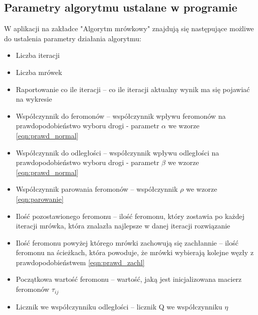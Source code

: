 \documentclass[12pt]{article}
\begin{document}
\subsection{Parametry algorytmu ustalane w programie}
W aplikacji na zakładce "Algorytm mrówkowy" znajdują się następujące możliwe do ustalenia parametry działania algorytmu:
\begin{itemize}
\item Liczba iteracji
\item Liczba mrówek
\item Raportowanie co ile iteracji -- co ile iteracji aktualny wynik ma się pojawiać na wykresie
\item Współczynnik do feromonów -- współczynnik wpływu feromonów na prawdopodobieństwo wyboru drogi - parametr $\alpha$ we wzorze \eqref{eqn:prawd_normal}
\item Współczynnik do odległości -- współczynnik wpływu odległości na prawdopodobieństwo wyboru drogi - parametr $\beta$ we wzorze \eqref{eqn:prawd_normal}
\item Współczynnik parowania feromonów -- współczynnik $\rho$ we wzorze \eqref{eqn:parowanie}
\item Ilość pozostawionego feromonu -- ilość feromonu, który zostawia po każdej iteracji mrówka, która znalazła najlepsze w danej iteracji rozwiązanie
\item Ilość feromonu powyżej którego mrówki zachowują się zachłannie -- ilość feromonu na ścieżkach, która powoduje, że mrówki wybierają kolejne węzły z prawdopodobieństwem \eqref{eqn:prawd_zachl}
\item Początkowa wartość feromonu -- wartość, jaką jest inicjalizowana macierz feromonów $\tau_{ij}$
\item Licznik we współczynniku odległości -- licznik Q we współczynniku $\eta$
\end{itemize}
\end{document}

